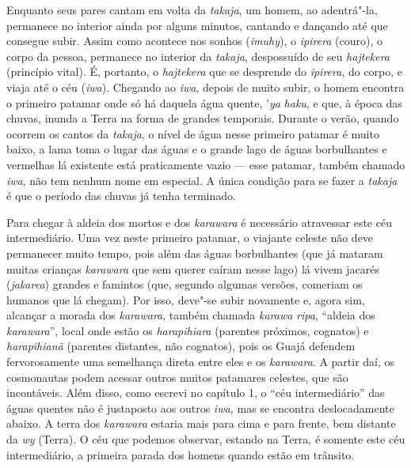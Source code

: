 Enquanto seus pares cantam em volta da \emph{takaja}, um homem, ao
adentrá"-la, permanece no interior ainda por alguns minutos, cantando e
dançando até que consegue subir. Assim como acontece nos sonhos
(\emph{imuhy}), o \emph{ipirera} (couro), o corpo da pessoa, permanece
no interior da \emph{takaja}, despossuído de seu \emph{hajtekera}
(princípio vital). É, portanto, o \emph{hajtekera} que se desprende do
\emph{ipirera}, do corpo, e viaja até o céu (\emph{iwa}). Chegando ao
\emph{iwa}, depois de muito subir, o homem encontra o primeiro patamar
onde só há daquela água quente, '\emph{ya} \emph{haku}, e que, à época
das chuvas, inunda a Terra na forma de grandes temporais. Durante o
verão, quando ocorrem os cantos da \emph{takaja}, o nível de água nesse
primeiro patamar é muito baixo, a lama toma o lugar das águas e o grande
lago de águas borbulhantes e vermelhas lá existente está praticamente
vazio --- esse patamar, também chamado \emph{iwa}, não tem nenhum nome em
especial. A única condição para se fazer a \emph{takaja} é que o período
das chuvas já tenha terminado.

Para chegar à aldeia dos mortos e dos \emph{karawara} é necessário
atravessar este céu intermediário. Uma vez neste primeiro patamar, o
viajante celeste não deve permanecer muito tempo, pois além das águas
borbulhantes (que já mataram muitas crianças \emph{karawara} que sem
querer caíram nesse lago) lá vivem jacarés (\emph{jakarea}) grandes e
famintos (que, segundo algumas versões, comeriam os humanos que lá
chegam). Por isso, deve"-se subir novamente e, agora sim, alcançar a
morada dos \emph{karawara}, também chamada \emph{karawa} \emph{ripa},
``aldeia dos \emph{karawara}'', local onde estão os \emph{harapihiara}
(parentes próximos, cognatos) e \emph{harapihianã} (parentes distantes,
não cognatos), pois os Guajá defendem fervorosamente uma semelhança
direta entre eles e os \emph{karawara}. A partir daí, os cosmonautas
podem acessar outros muitos patamares celestes, que são incontáveis.
Além disso, como escrevi no capítulo 1, o ``céu intermediário'' das águas
quentes não é justaposto aos outros \emph{iwa,} mas se encontra
deslocadamente abaixo. A terra dos \emph{karawara} estaria mais para
cima e para frente, bem distante da \emph{wy} (Terra). O céu que podemos
observar, estando na Terra, é somente este céu intermediário, a primeira
parada dos homens quando estão em trânsito.

